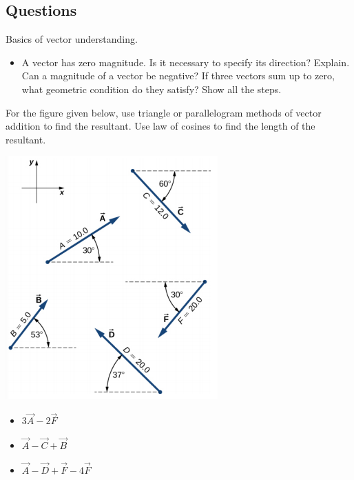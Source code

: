 \documentclass[12pt,addpoints]{exam}
\begin{document}
\begin{questions}
\begin{center}
   			\subsection*{Questions}	
   		\end{center}
   		\question Basics of vector understanding.
   		\begin{itemize}
   			\item A vector has zero magnitude. Is it necessary to specify its direction? Explain. \vspace{1cm}
   			\question Can a magnitude of a vector be negative?\vspace{1cm}
   			\question If three vectors sum up to zero, what geometric condition do they satisfy? Show all the steps. \vspace{1in}
   		\end{itemize}
   		\question For the figure given below, use triangle or parallelogram methods of vector addition to find the resultant. Use law of cosines to find the length of the resultant.
   		\begin{center}
   			\includegraphics[scale=0.5]{vectors}
   		\end{center}
   		\begin{itemize}
   			\item $3\vec{A} - 2 \vec{F}$ \vspace{1.5in}
   			\item $\vec{A} -  \vec{C} + \vec{B}$ \vspace{1.5in}
   			\item $\vec{A} -  \vec{D} + \vec{F}-4\vec{F}$ \vspace{1.5in}
   		\end{itemize}

\end{questions}
\end{document}

